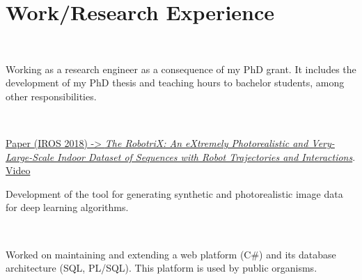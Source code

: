\documentclass[]{deedy-resume-openfont}
\begin{document}
\begin{minipage}[t]{0.495\textwidth} 


\section{Work/Research Experience}

 \\
\vspace{\topsep} %
\begin{tightemize}
	\item Working as a research engineer as a consequence of my PhD grant. It includes the development of my PhD thesis and teaching hours to bachelor students, among other responsibilities.
\end{tightemize}

\sectionsep

 \\
\vspace{\topsep} %
\begin{tightemize}
	\item \href{https://ieeexplore.ieee.org/stamp/stamp.jsp?tp=&arnumber=8594495}{ Paper (IROS 2018) -> \textit{The RobotriX: An eXtremely Photorealistic and Very-Large-Scale Indoor Dataset of Sequences with Robot Trajectories and Interactions}}. \href{https://www.youtube.com/watch?v=CiRc5tCtCak}{ Video}
	\item Development of the tool for generating synthetic and photorealistic image data for deep learning algorithms.
\end{tightemize}

\sectionsep

\\
\begin{tightemize}
\item Worked on maintaining and extending a web platform (C\#) and its database architecture (SQL, PL/SQL). This platform is used by public organisms.
\end{tightemize}


\end{minipage}
\end{document}

